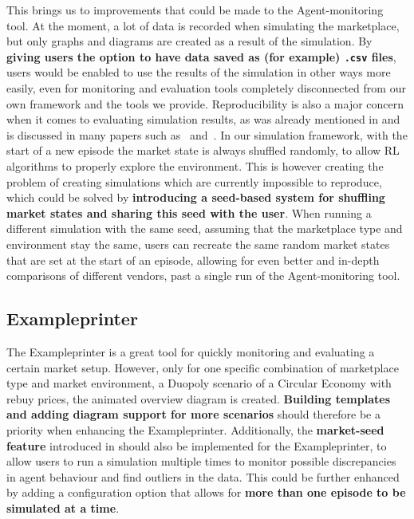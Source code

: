 This brings us to improvements that could be made to the Agent-monitoring tool. At the moment, a lot of data is recorded when simulating the marketplace, but only graphs and diagrams are created as a result of the simulation. By \textbf{giving users the option to have data saved as (for example) \texttt{.csv} files}, users would be enabled to use the results of the simulation in other ways more easily, even for monitoring and evaluation tools completely disconnected from our own framework and the tools we provide. Reproducibility is also a major concern when it comes to evaluating simulation results, as was already mentioned in  and is discussed in many papers such as~\cite{DRLThatMatters} and~\cite{ReproducibilityRL}. In our simulation framework, with the start of a new episode the market state is always shuffled randomly, to allow RL algorithms to properly explore the environment. This is however creating the problem of creating simulations which are currently impossible to reproduce, which could be solved by \textbf{introducing a seed-based system for shuffling market states and sharing this seed with the user}. When running a different simulation with the same seed, assuming that the marketplace type and environment stay the same, users can recreate the same random market states that are set at the start of an episode, allowing for even better and in-depth comparisons of different vendors, past a single run of the Agent-monitoring tool.

\subsection{Exampleprinter}\label{subsec:FutureExampleprinter}

The Exampleprinter is a great tool for quickly monitoring and evaluating a certain market setup. However, only for one specific combination of marketplace type and market environment, a Duopoly scenario of a Circular Economy with rebuy prices, the animated overview diagram is created. \textbf{Building templates and adding diagram support for more scenarios} should therefore be a priority when enhancing the Exampleprinter. Additionally, the \textbf{market-seed feature} introduced in  should also be implemented for the Exampleprinter, to allow users to run a simulation multiple times to monitor possible discrepancies in agent behaviour and find outliers in the data. This could be further enhanced by adding a configuration option that allows for \textbf{more than one episode to be simulated at a time}.

